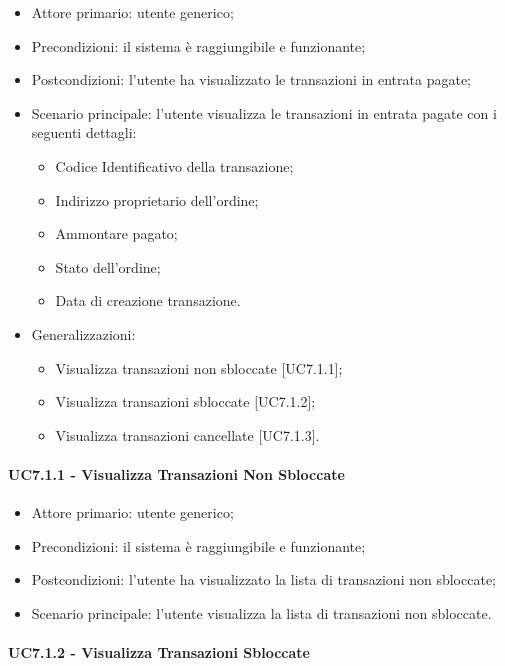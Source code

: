\begin{itemize}
    \item Attore primario: utente generico;
    \item Precondizioni: il sistema è raggiungibile e funzionante;
    \item Postcondizioni: l'utente ha visualizzato le transazioni in entrata pagate;
    \item Scenario principale: l'utente visualizza le transazioni in entrata pagate con i seguenti dettagli:
        \begin{itemize}
            \item Codice Identificativo della transazione;
            \item Indirizzo proprietario dell'ordine;
            \item Ammontare pagato;
            \item Stato dell'ordine;
            \item Data di creazione transazione.
        \end{itemize}
    \item Generalizzazioni:
          \begin{itemize}
              \item Visualizza transazioni non sbloccate [UC7.1.1];
              \item Visualizza transazioni sbloccate [UC7.1.2];
              \item Visualizza transazioni cancellate [UC7.1.3].
          \end{itemize}
\end{itemize}

\paragraph{UC7.1.1 - Visualizza Transazioni Non Sbloccate}

\begin{itemize}
    \item Attore primario: utente generico;
    \item Precondizioni: il sistema è raggiungibile e funzionante;
    \item Postcondizioni: l'utente ha visualizzato la lista di transazioni non sbloccate;
    \item Scenario principale: l'utente visualizza la lista di transazioni non sbloccate.
\end{itemize}

\paragraph{UC7.1.2 - Visualizza Transazioni Sbloccate}


